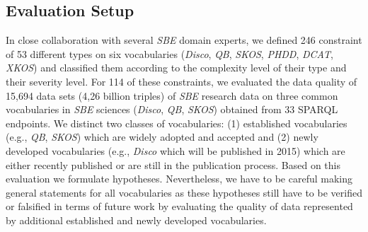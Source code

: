 \documentclass{llncs}
\begin{document}
{{\subsection{Evaluation Setup}

In close collaboration with several \emph{SBE} domain experts, we defined 246 constraint 
of 53 different types on six vocabularies (\emph{Disco}, \emph{QB}, \emph{SKOS}, \emph{PHDD}, \emph{DCAT}, \emph{XKOS}) and classified them according to the complexity level of their type and their severity level. 
For 114 of these constraints, we evaluated the data quality of 15,694 data sets (4,26 billion triples) of \emph{SBE} research data on three common vocabularies in \emph{SBE} sciences (\emph{Disco}, \emph{QB}, \emph{SKOS}) obtained from 33 SPARQL endpoints.
We distinct two classes of vocabularies: 
(1) established vocabularies (e.g., \emph{QB}, \emph{SKOS}) which are widely adopted and accepted and 
(2) newly developed vocabularies (e.g., \emph{Disco} which will be published in 2015) which are either recently published or are still in the publication process.
Based on this evaluation we formulate hypotheses.
Nevertheless, we have to be careful making general statements for all vocabularies 
as these hypotheses still have to be verified or falsified in terms of future work 
by evaluating the quality of data represented by additional established and newly developed vocabularies.

}}
\end{document}
